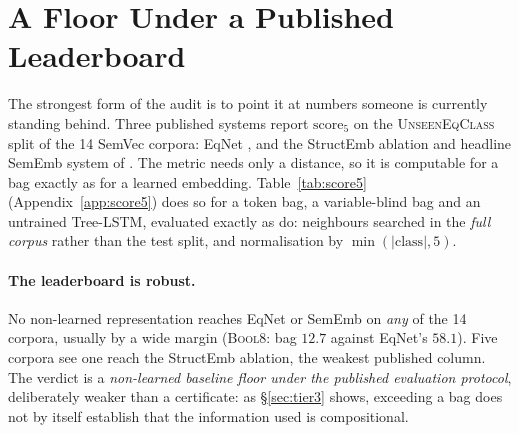 \section{A Floor Under a Published Leaderboard}
\label{sec:leaderboard}

The strongest form of the audit is to point it at numbers someone is currently standing behind.
Three published systems report $\mathrm{score}_5$ on the \textsc{UnseenEqClass} split of the 14
SemVec corpora: EqNet \citep{allamanis2017learning}, and the StructEmb ablation and headline
SemEmb system of \citet{gangwar2023semantic}. The metric needs only a distance, so it is computable
for a bag exactly as for a learned embedding. Table~\ref{tab:score5} (Appendix~\ref{app:score5})
does so for a token bag, a variable-blind bag and an untrained Tree-LSTM, evaluated exactly as
\citet{allamanis2017learning} do: neighbours searched in the \emph{full corpus} rather than the test
split, and normalisation by $\min(|\text{class}|, 5)$.

\paragraph{The leaderboard is robust.} No non-learned representation reaches EqNet or SemEmb on
\emph{any} of the 14 corpora, usually by a wide margin (\textsc{Bool8}: bag $12.7$ against EqNet's
$58.1$). Five corpora see one reach the StructEmb ablation, the weakest published column. The
verdict is a \emph{non-learned baseline floor under the published evaluation protocol}, deliberately weaker than a certificate: as \S\ref{sec:tier3} shows,
exceeding a bag does not by itself establish that the information used is compositional.
